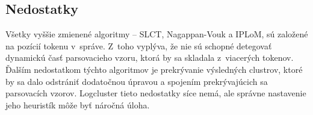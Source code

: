 \subsection{Nedostatky}
Všetky vyššie zmienené algoritmy -- SLCT, Nagappan-Vouk a IPLoM, sú založené na pozícií tokenu v~správe. Z~toho vyplýva, že nie sú schopné detegovať dynamickú časť parsovacieho vzoru, ktorá by sa skladala z~viacerých tokenov. Ďalším nedostatkom týchto algoritmov je prekrývanie výsledných clustrov, ktoré by sa dalo odstrániť dodatočnou úpravou a spojením prekrývajúcich sa parsovacích vzorov. Logcluster tieto nedostatky síce nemá, ale správne nastavenie jeho heuristík môže byť náročná úloha.